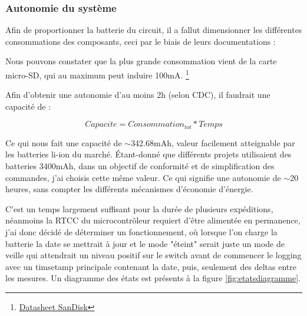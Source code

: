 {	\clearpage
	\subsubsection{Autonomie du système} \label{sssec:SysAutonomie}
	{
		Afin de proportionner la batterie du circuit, il a fallut dimensionner les différentes consommations des composants, ceci par le biais de leurs documentations :
		
		\begin{center}
			   \fbox{\textit{\textcolor{red}{Carte-SD - 100mA}}}    
		\end{center}
		
		Nous pouvons constater que la plus grande consommation vient de la carte micro-SD, qui au maximum peut induire 100mA. \footnote{\href{https://images-na.ssl-images-amazon.com/images/I/91tTtUMDM3L.pdf}{Datasheet SanDisk} }
		
		
		Afin d'obtenir une autonomie d'au moins 2h (selon CDC), il faudrait une capacité de :
		
		\begin{equation}
			Capacite = Consommation_{tot} * Temps
		\end{equation}
		
		Ce qui nous fait une capacité de $\sim$342.68mAh, valeur facilement atteignable par les batteries li-ion du marché. Étant-donné que différents projets utilisaient des batteries 3400mAh, dans un objectif de conformité et de simplification des commandes, j'ai choisis cette même valeur.
		Ce qui signifie une autonomie de $\sim$20 heures, sans compter les différents mécanismes d'économie d'énergie.
		
		C'est un temps largement suffisant pour la durée de plusieurs expéditions, néanmoins la RTCC du microcontrôleur requiert d'être alimentée en permanence, j'ai donc décidé de déterminer un fonctionnement, où lorsque l'on charge la batterie la date se mettrait à jour et le mode "éteint" serait juste un mode de veille qui attendrait un niveau positif sur le switch avant de commencer le logging avec un timsetamp principale contenant la date, puis, seulement des deltas entre les mesures. Un diagramme des états est présents à la figure \ref{fig:etatsdiagramme}.
		
}}
